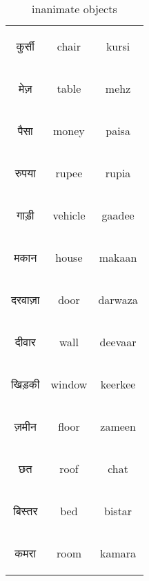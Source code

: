 \begin{table}[H]
    \centering 
    \begin{tabular}{c|c|c}
        \begin{hindi} कुर्सी \end{hindi} & chair & kursi \\
        \begin{hindi} मेज़ \end{hindi} & table & mehz \\
        \begin{hindi} पैसा \end{hindi} & money & paisa \\
        \begin{hindi} रुपया \end{hindi} & rupee & rupia \\
        \begin{hindi} गाड़ी \end{hindi} & vehicle & gaadee \\

        \begin{hindi} मकान \end{hindi} & house & makaan \\
        \begin{hindi} दरवाज़ा \end{hindi} & door & darwaza \\
        \begin{hindi} दीवार \end{hindi} & wall & deevaar \\
        \begin{hindi} खिड़की \end{hindi} & window & keerkee \\
        \begin{hindi} ज़मीन \end{hindi} & floor & zameen \\
        \begin{hindi} छत \end{hindi} & roof & chat \\
        \begin{hindi} बिस्तर \end{hindi} & bed & bistar \\
        \begin{hindi} कमरा \end{hindi} & room & kamara \\

    \end{tabular}
    \caption{inanimate objects}
    \label{tab:nouns_inanimate}
\end{table}






